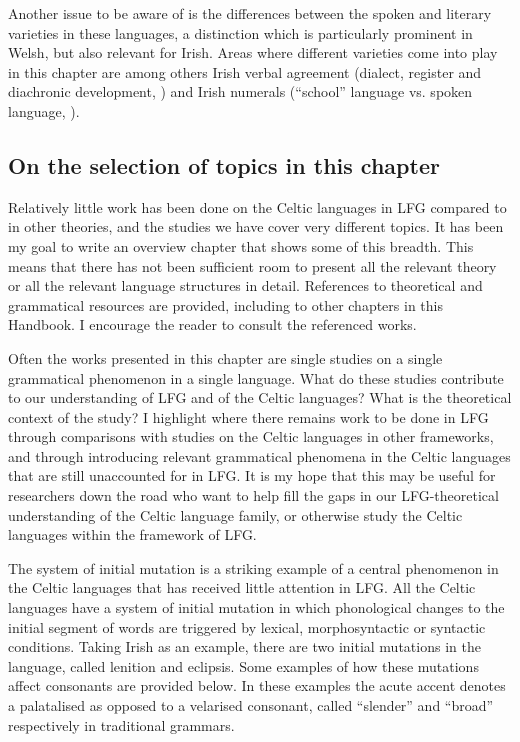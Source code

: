 \documentclass[output=paper,colorlinks,citecolor=brown]{langscibook}
\begin{document}
Another issue to be aware of is the differences between the spoken and literary varieties in these languages, a distinction which is particularly prominent in Welsh, but also relevant for Irish. Areas where different varieties come into play in this chapter are among others Irish verbal agreement (dialect, register and diachronic development, ) and Irish numerals (``school'' language vs. spoken language, ).

\subsection{On the selection of topics in this chapter}
\label{sec:Celtic:1.2}

Relatively little work has been done on the Celtic languages in LFG compared to in other theories, and the studies we have cover very different topics. It has been my goal to write an overview chapter that shows some of this breadth. This means that there has not been sufficient room to present all the relevant theory or all the relevant language structures in detail. References to theoretical and grammatical resources are provided, including to other chapters in this Handbook. I encourage the reader to consult the referenced works.

Often the works presented in this chapter are single studies on a single grammatical phenomenon in a single language. What do these studies contribute to our understanding of LFG and of the Celtic languages? What is the theoretical context of the study? I highlight where there remains work to be done in LFG through comparisons with studies on the Celtic languages in other frameworks, and through introducing relevant grammatical phenomena in the Celtic languages that are still unaccounted for in LFG. It is my hope that this may be useful for researchers down the road who want to help fill the gaps in our LFG-theoretical understanding of the Celtic language family, or otherwise study the Celtic languages within the framework of LFG. 

The system of initial mutation is a striking example of a central phenomenon in the Celtic languages that has received little attention in LFG. All the Celtic languages have a system of initial mutation in which phonological changes to the initial segment of words are triggered by lexical, morphosyntactic or syntactic conditions. Taking Irish as an example, there are two initial mutations in the language, called lenition and eclipsis. Some examples of how these mutations affect consonants are provided below. In these examples the acute accent denotes a palatalised as opposed to a velarised consonant, called ``slender'' and ``broad'' respectively in traditional grammars.
\end{document}
